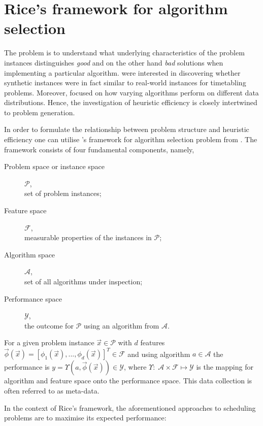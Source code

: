 \section{Rice's framework for algorithm selection}\label{sec:rice}
The problem is to understand what underlying characteristics of the problem 
instances distinguishes \emph{good} and on the other hand \emph{bad} solutions 
when implementing a particular algorithm. \citet{SmithMilesLion5} were 
interested in discovering whether synthetic instances were in fact similar to 
real-world instances for timetabling problems. Moreover,  
\citeauthor{SmithMilesLion5} focused on how varying algorithms perform 
on different data distributions. Hence, the investigation of heuristic 
efficiency is closely intertwined to problem generation. 

In order to formulate the relationship between problem structure and heuristic efficiency one can utilise \citeauthor{Rice76}'s framework for algorithm selection problem from \citeyear{Rice76}. The framework consists of four fundamental components, namely,
\begin{description}
	\item[Problem space or instance space] $\mathcal{P}$, \hfill\\
	set of problem instances; 
	\item[Feature space] $\mathcal{F}$, \hfill\\
	measurable properties of the instances in $\mathcal{P}$;
	\item[Algorithm space] $\mathcal{A}$, \hfill\\
	set of all algorithms under inspection;
	\item[Performance space] $\mathcal{Y}$, \hfill\\
	the outcome for $\mathcal{P}$ using an algorithm from $\mathcal{A}$.
\end{description}
For a given problem instance $\vec{x}\in\mathcal{P}$ with $d$ features 
$\vec{\phi}(\vec{x})=\left[\phi_1(\vec{x}),...,\phi_d( 
\vec{x})\right]^T\in\mathcal{F}$ and using algorithm $a\in\mathcal{A}$ the 
performance is $y=\Upsilon(a,\vec{\phi}(\vec{x}))\in\mathcal{Y}$, where 
$\Upsilon:\;\mathcal{A}\times\mathcal{F} \mapsto \mathcal{Y}$ is the mapping 
for algorithm and feature space onto the performance space. This data 
collection is often referred to as meta-data. 

In the context of Rice's framework, the aforementioned approaches to scheduling problems are to maximise its expected performance: 

